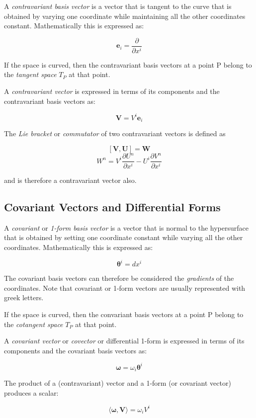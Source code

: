 \documentclass[english, 12pt]{book}
\begin{document}
A \emph{contravariant basis vector} is a vector that is tangent to the curve that is obtained by varying one coordinate while maintaining all the other coordinates constant. Mathematically this is expressed as:

\[
\mathbf{e}_i = \frac{\partial}{\partial x^i}
\]

If the space is curved, then the contravariant basis vectors at a point P belong to the \emph{tangent space} $T_P$ at that point.

A \emph{contravariant vector} is expressed in terms of its components and the contravariant basis vectors as:

\[
\mathbf{V} = V^i \mathbf{e}_i
\]

The \emph{Lie bracket} or \emph{commutator} of two contravariant vectors is defined as

\[
	\left[ \mathbf{V},\mathbf{U} \right] = \mathbf{W}
\]
\[
	W^n = V^i \frac{\partial U^n}{\partial x^i} - U^i \frac{\partial V^n}{\partial x^i}
\]

and is therefore a contravariant vector also.


\subsection{Covariant Vectors and Differential Forms}

A \emph{covariant} or \emph{1-form basis vector} is a vector that is normal to the hypersurface that is obtained by setting one coordinate constant while varying all the other coordinates. Mathematically this is expressed as:

\[
\boldsymbol\theta^i = dx^i
\]

The covariant basis vectors can therefore be considered the \emph{gradients} of the coordinates. Note that covariant or 1-form vectors are usually represented with greek letters.

If the space is curved, then the convariant basis vectors at a point P belong to the \emph{cotangent space} $T_P$ at that point.

A \emph{covariant vector} or \emph{covector} or differential 1-form is expressed in terms of its components and the covariant basis vectors as:

\[
\boldsymbol\omega = \omega_i \boldsymbol\theta^i
\]

The product of a (contravariant) vector and a 1-form (or covariant vector) produces a scalar:

\[
\langle \boldsymbol{\omega}, \mathbf{V} \rangle = \omega_i V^i
\]
\end{document}
